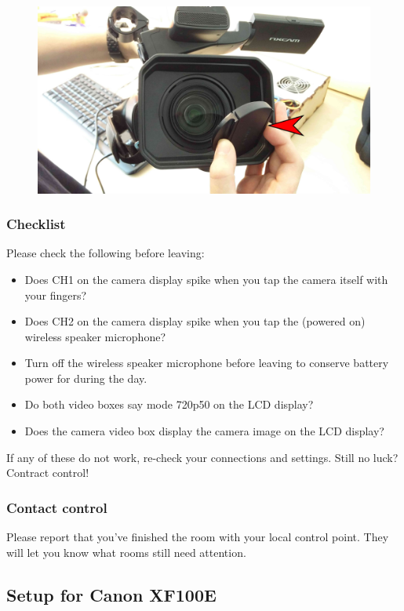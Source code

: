 \documentclass{article}
\begin{document}
\begin{figure}[H]
  \centering
\includegraphics[width = 120mm]{Sony07.jpg}
\end{figure}

\subsubsection{Checklist}
Please check the following before leaving:
\begin{itemize}
  \item Does CH1 on the camera display spike when you tap the camera itself with your fingers?
  \item Does CH2 on the camera display spike when you tap the (powered on) wireless speaker microphone?
  \item Turn off the wireless speaker microphone before leaving to conserve battery power for during the day.
  \item Do both video boxes say mode 720p50 on the LCD display?
  \item Does the camera video box display the camera image on the LCD display?
\end{itemize}

If any of these do not work, re-check your connections and settings. Still no luck? Contract control!

\subsubsection{Contact control}
Please report that you've finished the room with your local control point.
They will let you know what rooms still need attention.

\subsection{Setup for Canon XF100E}
\end{document}
